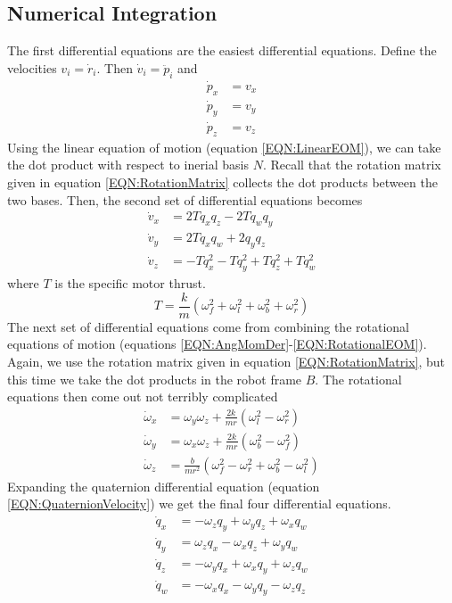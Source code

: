 \documentclass[lettersize,journal]{IEEEtran}
\begin{document}
\subsection{Numerical Integration}
The first differential equations are the easiest differential equations. Define the velocities $v_i = \dot{r}_i$. Then $\dot{v}_i=\ddot{p}_i$ and
\begin{align}
  \dot{p}_x &= v_x \label{EQN:VelocityX}\\
  \dot{p}_y &= v_y \\
  \dot{p}_z &= v_z \label{EQN:VelocityZ}
\end{align}
Using the linear equation of motion (equation \ref{EQN:LinearEOM}), we can take the dot product with respect to inerial basis $N$.
Recall that the rotation matrix given in equation \ref{EQN:RotationMatrix} collects the dot products between the two bases.
Then, the second set of differential equations becomes
\begin{align}
  \dot{v}_x &= 2Tq_xq_z-2Tq_wq_y \\
  \dot{v}_y &= 2Tq_xq_w+2q_yq_z \\
  \dot{v}_z &= -Tq_x^2-Tq_y^2+Tq_z^2+Tq_w^2
\end{align}
where $T$ is the specific motor thrust.
\begin{equation}
  T = \frac{k}{m}\left(\omega_f^2 + \omega_l^2 + \omega_b^2 + \omega_r^2\right)
\end{equation}
The next set of differential equations come from combining the rotational equations of motion (equations \ref{EQN:AngMomDer}-\ref{EQN:RotationalEOM}).
Again, we use the rotation matrix given in equation \ref{EQN:RotationMatrix}, but this time we take the dot products in the robot frame $B$.
The rotational equations then come out not terribly complicated
\begin{align}
  \dot{\omega}_x &= \omega_y\omega_z+\frac{2k}{mr}\left(\omega_l^2-\omega_r^2\right) \\
  \dot{\omega}_y &= \omega_x\omega_z+\frac{2k}{mr}\left(\omega_b^2-\omega_f^2\right) \\
  \dot{\omega}_z &= \frac{b}{mr^2}\left(\omega_f^2-\omega_r^2+\omega_b^2-\omega_l^2\right)
\end{align}
Expanding the quaternion differential equation (equation  \ref{EQN:QuaternionVelocity}) we get the final four differential equations.
\begin{align}
  \dot{q}_x &= -\omega_z q_y + \omega_y q_z + \omega_x q_w \\
  \dot{q}_y &= \omega_z q_x - \omega_x q_z + \omega_y q_w  \\
  \dot{q}_z &= -\omega_y q_x + \omega_x q_y + \omega_z q_w \\
  \dot{q}_w &=- \omega_x q_x - \omega_y q_y - \omega_z q_z
\end{align}
\end{document}
